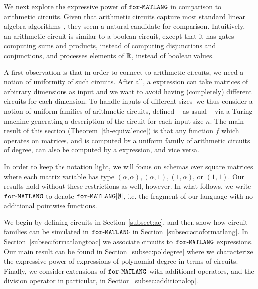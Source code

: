 We next explore the expressive power of $\texttt{for}\text{-}\texttt{MATLANG}$ in comparison to arithmetic circuits.
Given that arithmetic circuits capture most standard linear algebra algorithms~\cite{Raz02,ShpilkaY10},
they seem a natural candidate for comparison. 
%
Intuitively, an arithmetic circuit is similar to a boolean circuit,
except that it has gates computing sums and products, 
instead of computing disjunctions and conjunctions, and processes elements of $\mathbb{R}$, 
instead of boolean values. 


A first observation is that in order to connect \langfor to arithmetic circuits, we need a 
notion of uniformity of such circuits. After all, a \langfor expression can take matrices 
of arbitrary dimensions as input and we want to avoid having (completely) different circuits
for each dimension.
%
To handle inputs of different sizes, we thus consider a notion of uniform families of arithmetic
circuits, defined -- as usual -- via a Turing machine generating a description of the circuit for 
each input size $n$.
%
The main result of this section (Theorem~\ref{th-equivalence}) is that any function $f$ which operates on matrices, and is computed 
by a uniform family of arithmetic circuits of  degree, can also be computed by 
a \langfor expression, and vice versa.

In order to keep the notation light, we will focus on \langfor schemas over square matrices where 
each matrix variable has type $(\alpha,\alpha),(\alpha,1),(1,\alpha)$, or $(1,1)$.
Our results hold without these restrictions as well, however. 
%
In what follows, we write $\texttt{for}\text{-}\texttt{MATLANG}$ to denote $\texttt{for}\text{-}\texttt{MATLANG}[\emptyset]$, i.e. the fragment of 
our language with no additional pointwise functions. 
%

We begin by defining circuits in Section~\ref{subsect:ac}, and then show how circuit families can be
simulated in $\texttt{for}\text{-}\texttt{MATLANG}$ in Section~\ref{subsec:actoformatlang}. In Section~\ref{subsec:formatlangtoac} 
we associate circuits to $\texttt{for}\text{-}\texttt{MATLANG}$ expressions. Our main result can be found in Section~\ref{subsec:poldegree}
where we characterize the expressive power of \langfor expressions of polynomial degree in terms of circuits.
Finally, we consider extensions of $\texttt{for}\text{-}\texttt{MATLANG}$ with additional
operators, and the division operator in particular, in Section~\ref{subsec:additionalop}.

